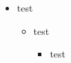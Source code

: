 \documentclass{beamer}
\begin{document}
\begin{frame}
    \begin{itemize}
        \item test
        \begin{itemize}
            \item test
            \begin{itemize}
                \item test
            \end{itemize}
        \end{itemize}
    \end{itemize}
\end{frame}
\end{document}
